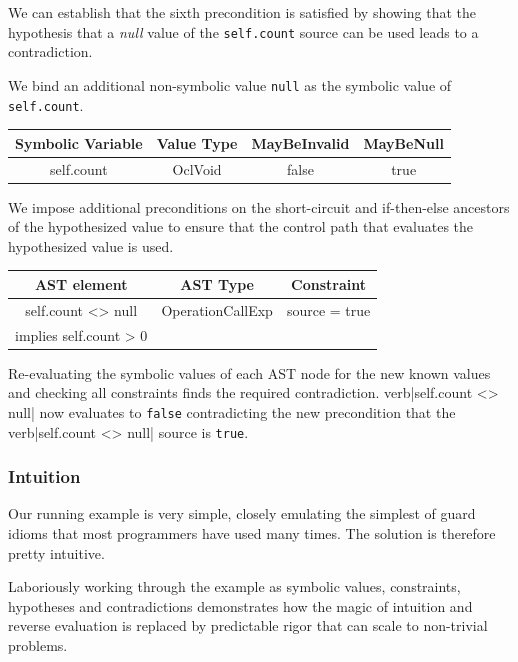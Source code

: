\documentclass{llncs}
\begin{document}
We can establish that the sixth precondition is satisfied by showing that the hypothesis that a \emph{null} value of the \verb|self.count| source can be used leads to a contradiction. 

We bind an additional non-symbolic value \verb|null| as the symbolic value of \verb|self.count|.

\begin{center}
	\begin{tabular}{|c||c|c||c|}
		\hline
		Symbolic Variable & Value Type & MayBeInvalid & MayBeNull \\
		\hline
		self.count & OclVoid & false & true \\
		\hline
	\end{tabular}
\end{center} 

We impose additional preconditions on the short-circuit and if-then-else ancestors of the hypothesized value to ensure that the control path that evaluates the hypothesized value is used.

\begin{center}
	\begin{tabular}{|c|c||c|}
		\hline
		AST element & AST Type & Constraint \\
		\hline
		\hline
        self.count <> null & OperationCallExp & source = true \\
		implies self.count > 0 && \\
		\hline
	\end{tabular}
\end{center}

Re-evaluating the symbolic values of each AST node for the new known values and checking all constraints finds the required contradiction. verb|self.count <> null| now evaluates to \verb|false| contradicting the new precondition that the verb|self.count <> null| source is \verb|true|.

\subsubsection{Intuition}
 
Our running example is very simple, closely emulating the simplest of guard idioms that most programmers have used many times. The solution is therefore pretty intuitive.

Laboriously working through the example as symbolic values, constraints, hypotheses and contradictions demonstrates how the magic of intuition and reverse evaluation is replaced by predictable rigor that can scale to non-trivial problems.
\end{document}
